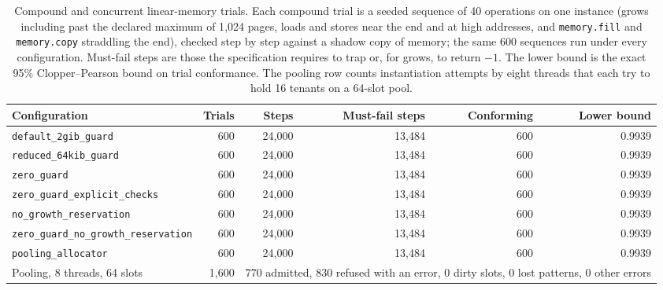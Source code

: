 \begin{table}[t]
\caption{Compound and concurrent linear-memory trials. Each compound trial is a seeded sequence of 40 operations on one instance (grows including past the declared maximum of 1{,}024 pages, loads and stores near the end and at high addresses, and \texttt{memory.fill} and \texttt{memory.copy} straddling the end), checked step by step against a shadow copy of memory; the same 600 sequences run under every configuration. Must-fail steps are those the specification requires to trap or, for grows, to return $-1$. The lower bound is the exact 95\% Clopper--Pearson bound on trial conformance. The pooling row counts instantiation attempts by eight threads that each try to hold 16 tenants on a 64-slot pool.}\label{tab:rq2_compound}
\footnotesize
\setlength{\tabcolsep}{4pt}%
\begin{adjustbox}{max width=\textwidth}%
\begin{tabular}{lrrrrr}
\toprule
Configuration & Trials & Steps & Must-fail steps & Conforming & Lower bound \\
\midrule
\texttt{default\_2gib\_guard} & 600 & 24,000 & 13,484 & 600 & 0.9939 \\
\texttt{reduced\_64kib\_guard} & 600 & 24,000 & 13,484 & 600 & 0.9939 \\
\texttt{zero\_guard} & 600 & 24,000 & 13,484 & 600 & 0.9939 \\
\texttt{zero\_guard\_explicit\_checks} & 600 & 24,000 & 13,484 & 600 & 0.9939 \\
\texttt{no\_growth\_reservation} & 600 & 24,000 & 13,484 & 600 & 0.9939 \\
\texttt{zero\_guard\_no\_growth\_reservation} & 600 & 24,000 & 13,484 & 600 & 0.9939 \\
\texttt{pooling\_allocator} & 600 & 24,000 & 13,484 & 600 & 0.9939 \\
\midrule
Pooling, 8 threads, 64 slots & 1,600 & \multicolumn{4}{l}{770 admitted, 830 refused with an error, 0 dirty slots, 0 lost patterns, 0 other errors} \\
\bottomrule
\end{tabular}%
\end{adjustbox}
\end{table}
